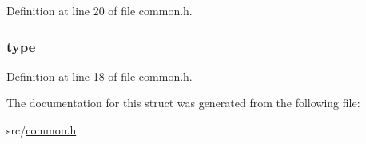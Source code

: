 Definition at line 20 of file common.h.

\hypertarget{structmtn__request_ad81724fd696b045cdceb4c97fdc4eea9}{
\subsubsection[{type}]{ {\bf type}}}
\label{structmtn__request_ad81724fd696b045cdceb4c97fdc4eea9}


Definition at line 18 of file common.h.



The documentation for this struct was generated from the following file:\begin{DoxyCompactItemize}
\item 
src/\hyperlink{common_8h}{common.h}\end{DoxyCompactItemize}
